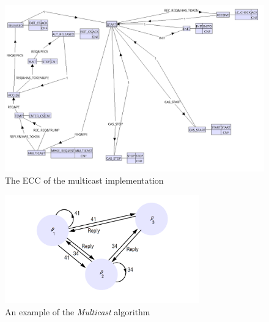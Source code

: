 \documentclass[12pt, conference]{IEEEtran}
\begin{document}
\begin{figure}[htbp]
  \centerline{\includegraphics[width=1.0\textwidth]{multicast-ecc.png}}
  \caption{The ECC of the multicast implementation}
\label{fig:multicast-ecc}
\end{figure}

\begin{figure}[htbp]
  \centerline{\includegraphics[width=0.75\textwidth]{multicast.png}}
  \caption{\large An example of the \textit{Multicast} algorithm}
\label{fig:multicast}
\end{figure}
\end{document}
